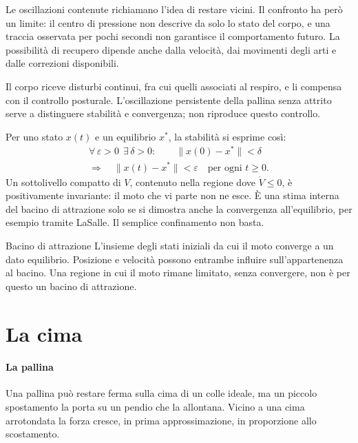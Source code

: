 \documentclass[11pt,a4paper,twoside=false,headinclude,footinclude]{scrartcl}
\begin{document}
Le oscillazioni contenute richiamano l'idea di restare vicini. Il confronto ha però un limite: il centro di pressione non descrive da solo lo stato del corpo, e una traccia osservata per pochi secondi non garantisce il comportamento futuro. La possibilità di recupero dipende anche dalla velocità, dai movimenti degli arti e dalle correzioni disponibili.

Il corpo riceve disturbi continui, fra cui quelli associati al respiro, e li compensa con il controllo posturale. L'oscillazione persistente della pallina senza attrito serve a distinguere stabilità e convergenza; non riproduce questo controllo.

\begin{formule}
Per uno stato $x(t)$ e un equilibrio $x^\ast$, la stabilità si esprime così:
\[
\begin{gathered}
\forall\,\varepsilon>0\ \ \exists\,\delta>0:\qquad
\lVert x(0)-x^\ast\rVert<\delta \\
\Longrightarrow\quad \lVert x(t)-x^\ast\rVert<\varepsilon
\quad \text{per ogni } t\ge 0 .
\end{gathered}
\]
Un sottolivello compatto di $V$, contenuto nella regione dove $\dot V\le0$, è positivamente invariante: il moto che vi parte non ne esce. È una stima interna del bacino di attrazione solo se si dimostra anche la convergenza all'equilibrio, per esempio tramite LaSalle. Il semplice confinamento non basta.
\end{formule}

\begin{parola}{Bacino di attrazione}
L'insieme degli stati iniziali da cui il moto converge a un dato equilibrio. Posizione e velocità possono entrambe influire sull'appartenenza al bacino. Una regione in cui il moto rimane limitato, senza convergere, non è per questo un bacino di attrazione.
\end{parola}

\section{La cima}\label{sec:cima}

\paragraph{La pallina} Una pallina può restare ferma sulla cima di un colle ideale, ma un piccolo spostamento la porta su un pendio che la allontana. Vicino a una cima arrotondata la forza cresce, in prima approssimazione, in proporzione allo scostamento.
\end{document}
